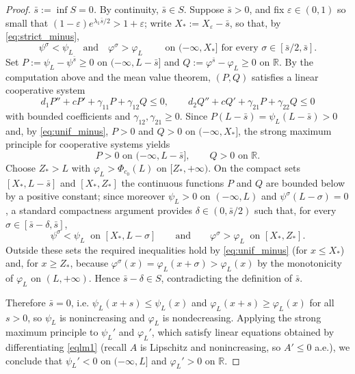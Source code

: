 \documentclass[10pt,a4paper]{amsart}
\begin{document}
\begin{proof}
	\emph{$\bar s:=\inf S=0$.} By continuity, $\bar s\in S$. Suppose
	$\bar s>0$, and fix $\varepsilon\in(0,1)$ so small that
	$(1-\varepsilon)e^{\lambda_1\bar s/2}>1+\varepsilon$; write
	$X_*:=X_\varepsilon-\bar s$, so that, by \eqref{eq:strict_minus},
	\begin{equation}\label{eq:unif_minus}
		\psi^{\sigma}<\psi_L \quad\text{and}\quad \varphi^{\sigma}>\varphi_L
		\qquad\text{ on } (-\infty,X_*] \text{ for every } \sigma\in[\bar s/2,\bar s].
	\end{equation}
	Set $P:=\psi_L-\psi^{\bar s}\ge0$ on $(-\infty,L-\bar s]$ and
	$Q:=\varphi^{\bar s}-\varphi_L\ge0$ on $\mathbb{R}$. By the computation above and the
	mean value theorem, $(P,Q)$ satisfies a linear cooperative system
	\[
	d_1P''+cP'+\gamma_{11}P+\gamma_{12}Q\le 0,\qquad
	d_2Q''+cQ'+\gamma_{21}P+\gamma_{22}Q\le 0
	\]
	with bounded coefficients and $\gamma_{12},\gamma_{21}\ge0$. Since
	$P(L-\bar s)=\psi_L(L-\bar s)>0$ and, by \eqref{eq:unif_minus},
	$P>0$ and $Q>0$ on $(-\infty,X_*]$, the strong maximum principle for
	cooperative systems yields
	\[
	P>0 \text{ on }(-\infty,L-\bar s],\qquad Q>0 \text{ on } \mathbb{R} .
	\]
	Choose $Z_*>L$ with $\varphi_L>\Phi_{c_0}(L)$ on $[Z_*,+\infty)$. On the
	compact sets $[X_*,L-\bar s]$ and $[X_*,Z_*]$ the continuous functions $P$
	and $Q$ are bounded below by a positive constant; since moreover
	$\psi_L>0$ on $(-\infty,L)$ and $\psi^\sigma(L-\sigma)=0$, a standard
	compactness argument provides $\delta\in(0,\bar s/2)$ such that, for every
	$\sigma\in[\bar s-\delta,\bar s]$,
	\[
	\psi^{\sigma}<\psi_L \ \text{ on }[X_*,L-\sigma]
	\qquad\text{and}\qquad
	\varphi^{\sigma}>\varphi_L \ \text{ on }[X_*,Z_*].
	\]
	Outside these sets the required inequalities hold by \eqref{eq:unif_minus}
	(for $x\le X_*$) and, for $x\ge Z_*$, because
	$\varphi^\sigma(x)=\varphi_L(x+\sigma)>\varphi_L(x)$ by the monotonicity of
	$\varphi_L$ on $(L,+\infty)$. Hence $\bar s-\delta\in S$, contradicting the
	definition of $\bar s$.

	Therefore $\bar s=0$, i.e. $\psi_L(x+s)\le\psi_L(x)$ and
	$\varphi_L(x+s)\ge\varphi_L(x)$ for all $s>0$, so $\psi_L$ is nonincreasing
	and $\varphi_L$ is nondecreasing. Applying the strong maximum principle to
	$\psi_L'$ and $\varphi_L'$, which satisfy linear equations obtained by
	differentiating \eqref{eqlm1} (recall $A$ is Lipschitz and nonincreasing, so
	$A'\le0$ a.e.), we conclude that $\psi_L'<0$ on $(-\infty,L]$ and
	$\varphi_L'>0$ on $\mathbb{R}$.
\end{proof}
\end{document}
